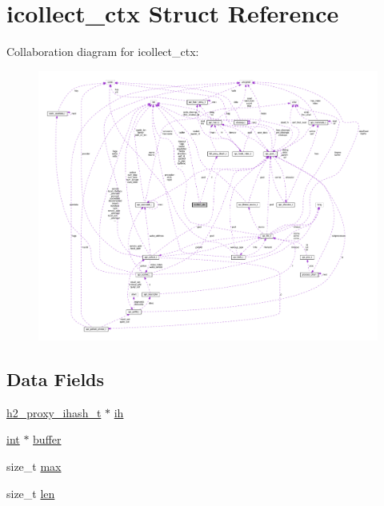 \hypertarget{structicollect__ctx}{}\section{icollect\+\_\+ctx Struct Reference}
\label{structicollect__ctx}


Collaboration diagram for icollect\+\_\+ctx\+:
\nopagebreak
\begin{figure}[H]
\begin{center}
\leavevmode
\includegraphics[width=350pt]{structicollect__ctx__coll__graph}
\end{center}
\end{figure}
\subsection*{Data Fields}
\begin{DoxyCompactItemize}
\item 
\hyperlink{structh2__proxy__ihash__t}{h2\+\_\+proxy\+\_\+ihash\+\_\+t} $\ast$ \hyperlink{structicollect__ctx_aac02420a629b2a9e7b735a23d8cca318}{ih}
\item 
\hyperlink{pcre_8txt_a42dfa4ff673c82d8efe7144098fbc198}{int} $\ast$ \hyperlink{structicollect__ctx_aa27f0a645c14ce0f113f7845a51ac5ca}{buffer}
\item 
size\+\_\+t \hyperlink{structicollect__ctx_a1c1ea1d6b2568d8ff1a6573ea28dd68f}{max}
\item 
size\+\_\+t \hyperlink{structicollect__ctx_aadf3d8c87d0bc6df4c99ad2ab45a88e4}{len}
\end{DoxyCompactItemize}


